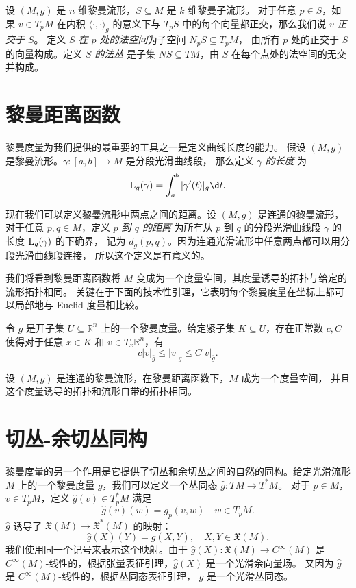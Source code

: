 设 $(M,g)$ 是 $n$ 维黎曼流形，$S\subseteq M$ 是 $k$ 维黎曼子流形。
对于任意 $p\in S$，如果 $v\in T_pM$ 在内积 $\langle\cdot,\cdot\rangle_g$
的意义下与 $T_pS$ 中的每个向量都正交，那么我们说 $v$ \emph{正交于 $S$}。
定义 \emph{$S$ 在 $p$ 处的法空间}为子空间 $N_pS\subseteq T_pM$，
由所有 $p$ 处的正交于 $S$ 的向量构成。定义 \emph{$S$ 的法丛}
是子集 $NS\subseteq TM$，由 $S$ 在每个点处的法空间的无交并构成。

\section{黎曼距离函数}

黎曼度量为我们提供的最重要的工具之一是定义曲线长度的能力。
假设 $(M,g)$ 是黎曼流形。$\gamma:[a,b]\to M$ 是分段光滑曲线段，
那么定义 \emph{$\gamma$ 的长度} 为
\[
  \LL_g(\gamma)=\int_a^b|\gamma'(t)|_g \d t.  
\]

现在我们可以定义黎曼流形中两点之间的距离。设 $(M,g)$ 是连通的黎曼流形，
对于任意 $p,q\in M$，定义 \emph{$p$ 到 $q$ 的距离} 为所有从 $p$
到 $q$ 的分段光滑曲线段 $\gamma$ 的长度 ${\mathrm{L}}_g(\gamma)$ 的下确界，
记为 $d_g(p,q)$。因为连通光滑流形中任意两点都可以用分段光滑曲线段连接，
所以这个定义是有意义的。

我们将看到黎曼距离函数将 $M$ 变成为一个度量空间，其度量诱导的拓扑与给定的流形拓扑相同。
关键在于下面的技术性引理，它表明每个黎曼度量在坐标上都可以局部地与 Euclid 度量相比较。

\begin{lemma}
  令 $g$ 是开子集 $U\subseteq \mathbb{R}^n$ 上的一个黎曼度量。给定紧子集 
  $K\subseteq U$，存在正常数 $c,C$ 使得对于任意 $x\in K$ 和 $v\in T_x \mathbb{R}^n$，有
  \[
    c|v|_{\bar g}\leq |v|_g\leq C|v|_{\bar g}.  
  \]
\end{lemma}

\begin{theorem}[黎曼流形作为度量空间]
  设 $(M,g)$ 是连通的黎曼流形，在黎曼距离函数下，$M$ 成为一个度量空间，
  并且这个度量诱导的拓扑和流形自带的拓扑相同。
\end{theorem}


\section{切丛-余切丛同构}

黎曼度量的另一个作用是它提供了切丛和余切丛之间的自然的同构。给定光滑流形 $M$
上的一个黎曼度量 $g$，我们可以定义一个丛同态 $\hat g:TM\to T^*M$。
对于 $p\in M$，$v\in T_pM$，定义 $\hat g(v)\in T_p^*M$ 满足
\[
  \hat g(v)(w)=g_p(v,w)\quad w\in T_pM.  
\]
$\hat g$ 诱导了 $\mathfrak{X}(M)\to \mathfrak{X}^*(M)$ 的映射：
\[
  \hat g(X)(Y)=g(X,Y),\quad X,Y\in \mathfrak{X}(M).
\]
我们使用同一个记号来表示这个映射。由于 $\hat g(X):\mathfrak{X}(M)\to C^\infty(M)$
是 $C^\infty(M)$-线性的，根据张量表征引理，$\hat g(X)$ 是一个光滑余向量场。
又因为 $\hat g$ 是 $C^\infty(M)$-线性的，根据丛同态表征引理，
$\hat g$ 是一个光滑丛同态。

